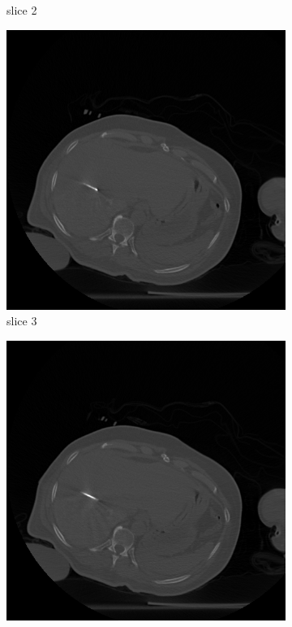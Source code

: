 \documentclass[journal]{IEEEtran}
\begin{document}
\begin{figure}[h!]
\begin{subfigure}[b]{0.24\linewidth}
 \caption{slice 2}
    \end{subfigure}
     \begin{subfigure}[b]{0.24\linewidth}
        \includegraphics[width=\textwidth]{../images/tmh/RFA2/template3.png}
 \caption{slice 3}
    \end{subfigure}
       \begin{subfigure}[b]{0.24\linewidth}
        \includegraphics[width=\textwidth]{../images/tmh/RFA2/template4.png}

\end{subfigure}
\end{figure}
\end{document}
